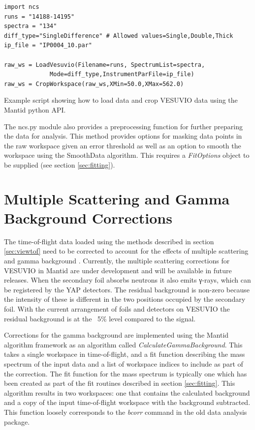 \documentclass[paper=a4, fontsize=11pt]{scrartcl}	%
\numberwithin{equation}{section}															%
\numberwithin{figure}{section}																%
\numberwithin{table}{section}
\begin{document}
\begin{listing}[H]
\begin{verbatim}
import ncs
runs = "14188-14195"
spectra = "134"
diff_type="SingleDifference" # Allowed values=Single,Double,Thick
ip_file = "IP0004_10.par"

raw_ws = LoadVesuvio(Filename=runs, SpectrumList=spectra,
		     Mode=diff_type,InstrumentParFile=ip_file)
raw_ws = CropWorkspace(raw_ws,XMin=50.0,XMax=562.0)
\end{verbatim}
\caption{Example script showing how to load data and crop VESUVIO data using the Mantid python API.}
\label{lst:loading-data}
\end{listing}

The ncs.py module also provides a preprocessing function for further preparing the data for analysis. This method provides options for masking data points in the raw workspace given an error threshold as well as an option to smooth the workspace using the SmoothData algorithm. This requires a \textit{FitOptions} object to be supplied (see section \ref{sec:fitting}).

\section{Multiple Scattering and Gamma Background Corrections}
\label{sec:corrections}
The time-of-flight data loaded using the methods described in section \ref{sec:viewtof} need to be corrected to account for the effects of multiple scattering \citep{mayers2002multiple} and gamma background \citep{mayers2011calculation}. Currently, the multiple scattering corrections for VESUVIO in Mantid are under development and will be available in future releases. When the secondary foil absorbs neutrons it also emits γ-rays, which can be registered by the YAP detectors. The residual background is non-zero because the intensity of these is different in the two positions occupied by the secondary foil. With the current arrangement of foils and detectors on VESUVIO the residual background is at the ~5\% level compared to the signal.

Corrections for the gamma background are implemented using the Mantid algorithm framework as an algorithm called \textit{CalculateGammaBackground}. This takes a single workspace in time-of-flight, and a fit function describing the mass spectrum of the input data and a list of workspace indices to include as part of the correction. The fit function for the mass spectrum is typically one which has been created as part of the fit routines described in section \ref{sec:fitting}. This algorithm results in two workspaces: one that contains the calculated background and a copy of the input time-of-flight workspace with the background subtracted. This function loosely corresponds to the \textit{bcorr} command in the old data analysis package.
\end{document}
